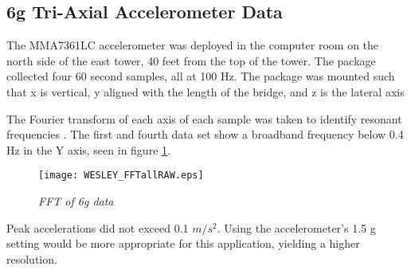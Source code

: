 \subsection{6g Tri-Axial Accelerometer Data}

The MMA7361LC accelerometer was deployed in the computer room on the north side of the east tower, 40 feet from the top of the tower. The package collected four 60 second samples, all at 100 Hz. The package was mounted such that x is vertical, y aligned with the length of the bridge, and z is the lateral axis

\indent The Fourier transform of each axis of each sample was taken to identify resonant frequencies . The first and fourth data set show a broadband frequency below 0.4 Hz in the Y axis, seen in figure \ref{fig:fftall}.

\begin{figure}
\centering
\texttt{[image: WESLEY\_FFTallRAW.eps]}
\caption{\textit{FFT of 6g data}}
\label{fig:fftall}
\end{figure}

\indent Peak accelerations did not exceed 0.1 $m/s^2$. Using the accelerometer’s 1.5 g setting would be more appropriate for this application, yielding a higher resolution. 
